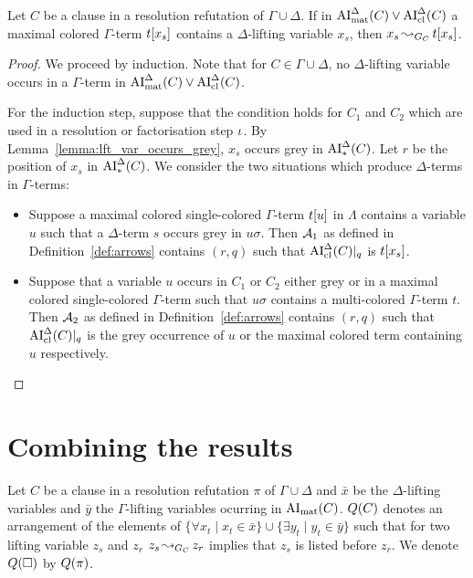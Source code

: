 \documentclass[,%
	draft=false,%
	numbers=noendperiod
	11pt,
	a4paper,
	oneside,%
	openany,
]{memoir}
\begin{document}
\begin{lemma}
	\label{lemma:arrow_for_lft_var}
	Let $C$ be a clause in a resolution refutation of $\Gamma \cup \Delta$.
	If in $\operatorname{AI}_\mathrm{mat}^\Delta(C) \lor \operatorname{AI}_\mathrm{cl}^\Delta(C)$	a maximal colored $\Gamma$-term $t[x_s]$ contains a $\Delta$-lifting variable $x_s$,
	then $x_s \operatorname{\leadsto}_{G_C} t[x_s]$.
\end{lemma}
\begin{proof}
	We proceed by induction. Note that for $C\in\Gamma\cup\Delta$, no $\Delta$-lifting variable occurs in a $\Gamma$-term in $\operatorname{AI}_\mathrm{mat}^\Delta(C) \lor \operatorname{AI}_\mathrm{cl}^\Delta(C)$.

	For the induction step, suppose that the condition holds for $C_1$ and $C_2$ which are used in a resolution or factorisation step $\iota$.
	By Lemma~\ref{lemma:lft_var_occurs_grey}, $x_s$ occurs grey in $\operatorname{AI}_\mathrm{*}^\Delta(C)$. Let $r$ be the position of $x_s$ in $\operatorname{AI}_\mathrm{*}^\Delta(C)$.
	We consider the two situations which produce $\Delta$-terms in $\Gamma$-terms:
	\begin{itemize}
		\item Suppose a maximal colored single-colored $\Gamma$-term $t[u]$ in $\Lambda$ contains a variable $u$ such that a $\Delta$-term $s$ occurs grey in $u\sigma$.
			Then $\operatorname{\mathcal{A}}_1$ as defined in Definition~\ref{def:arrows} contains $(r, q)$ such that $\operatorname{AI}_\mathrm{cl}^\Delta(C)|_{q}$ is $t[x_s]$.

		\item
			Suppose that a variable $u$ occurs in $C_1$ or $C_2$ either grey or in a maximal colored single-colored $\Gamma$-term such that $u\sigma$ contains a multi-colored $\Gamma$-term $t$.
			Then $\operatorname{\mathcal{A}}_2$ as defined in Definition~\ref{def:arrows} contains $(r, q)$ such that $\operatorname{AI}_\mathrm{cl}^\Delta(C)|_{q}$ is the grey occurrence of $u$ or the maximal colored term containing $u$ respectively.
			\qedhere
	\end{itemize}

\end{proof}



\section{Combining the results}

\begin{defi}
	\label{def:arrow_quantifier_block}
	Let $C$ be a clause in a resolution refutation $\pi$ of $\Gamma\cup\Delta$
	and $\bar x$ be the $\Delta$-lifting variables and $\bar y$ the $\Gamma$-lifting variables ocurring in $\operatorname{AI}_\mathrm{mat}(C)$.
	$Q(C)$ denotes an arrangement of the elements of  $\{ \forall x_t \mid x_t \in \bar x\} \cup \{ \exists y_t \mid y_t \in \bar y\}$ such that for two lifting variable $z_s$ and $z_r$ $z_s \operatorname{\leadsto}_{G_C} z_r$ implies that $z_s$ is listed before $z_r$.
	We denote $Q(\square)$ by $Q(\pi)$.
\end{defi}
\end{document}
